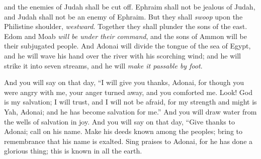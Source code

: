 \begin{biblechapter}
and the enemies of Judah shall be cut off. 
Ephraim shall not be jealous of Judah, 
and Judah shall not be an enemy of Ephraim.
\verse But they shall \textit{swoop} upon the Philistine shoulder, \textit{westward}. 
Together they shall plunder the sons of the east. 
Edom and Moab \textit{will be under their command}, 
and the sons of Ammon will be their subjugated people.
\verse And Adonai will divide the tongue of the sea of Egypt, 
and he will wave his hand over the river with his scorching wind; 
and he will strike it into seven streams, 
and he will \textit{make it passable by foot}.
\end{biblechapter}

\begin{biblechapter} %
 And you will say on that day, 
“I will give you thanks, Adonai, 
for though you were angry with me, 
your anger turned away, 
and you comforted me.
\verse Look! God is my salvation; 
I will trust, and I will not be afraid, 
for my strength and might is Yah, Adonai; 
and he has become salvation for me.”
\verse And you will draw water from the wells of salvation in joy.
\verse And you will say on that day,
\verse “Give thanks to Adonai; 
call on his name. 
Make his deeds known among the peoples; 
bring to remembrance that his name is exalted.
\verse Sing praises to Adonai, for he has done a glorious thing; 
this is known in all the earth.
\end{biblechapter}

